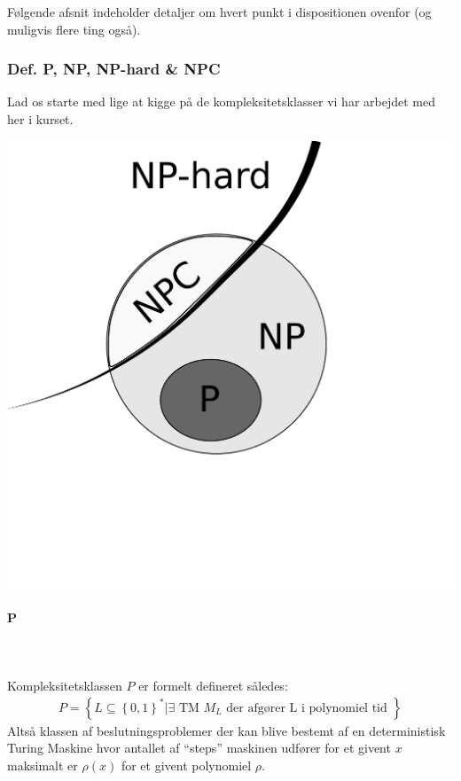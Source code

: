 Følgende afsnit indeholder detaljer om hvert punkt i dispositionen ovenfor (og muligvis flere ting også).

\subsubsection{Def. P, NP, NP-hard \& NPC}

Lad os starte med lige at kigge på de kompleksitetsklasser vi har arbejdet med her i kurset.
\begin{center}
 \includegraphics[bb=0 0 400 400,scale=0.3]{./PNPNPC.png}
\end{center}


\paragraph{P}
~\\
~\\
Kompleksitetsklassen $P$ er formelt defineret således:
\begin{align*}
 P = \left\lbrace L \subseteq \left\lbrace 0,1 \right\rbrace^* | \exists \text{ TM } M_L \text{ der afgører L i polynomiel tid } \right\rbrace
\end{align*}
Altså klassen af beslutningsproblemer der kan blive bestemt af en deterministisk Turing Maskine hvor antallet af ``steps'' maskinen udfører for et givent $x$ maksimalt er $\rho(x)$ for et givent polynomiel $\rho$.\\
 
